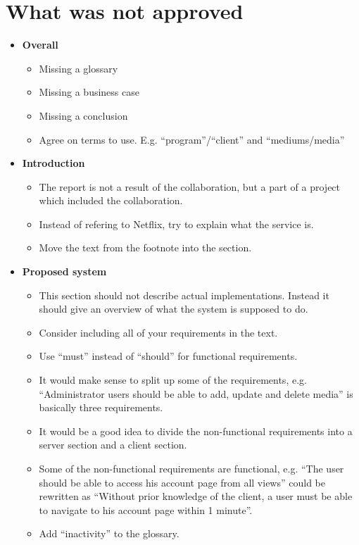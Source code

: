 \documentclass[../report.tex]{subfiles}
\begin{document}
\section*{What was not approved}
\begin{itemize}
\item \textbf{Overall}
	\begin{itemize}
	\item Missing a glossary
	\item Missing a business case
	\item Missing a conclusion
	\item Agree on terms to use. E.g. ``program''/``client'' and ``mediums/media'' \\
	\end{itemize}

\item \textbf{Introduction}
	\begin{itemize}
	\item The report is not a result of the collaboration, but a part of a project which included the collaboration.
	\item Instead of refering to Netflix, try to explain what the service is.
	\item Move the text from the footnote into the section.
	\end{itemize}

\item \textbf{Proposed system}
	\begin{itemize}
	\item This section should not describe actual implementations. Instead it should give an overview of what the system is supposed to do.
	\item Consider including all of your requirements in the text.
	\item Use ``must'' instead of ``should'' for functional requirements.
	\item It would make sense to split up some of the requirements, e.g. ``Administrator users should be able to add, update and delete media'' is basically three requirements.
	\item It would be a good idea to divide the non-functional requirements into a server section and a client section.
	\item Some of the non-functional requirements are functional, e.g. ``The user should be able to access his account page from all views'' could be rewritten as ``Without prior knowledge of the client, a user must be able to navigate to his account page within 1 minute''.
	\item Add ``inactivity'' to the glossary.	
	\end{itemize}


\end{itemize}
\end{document}
